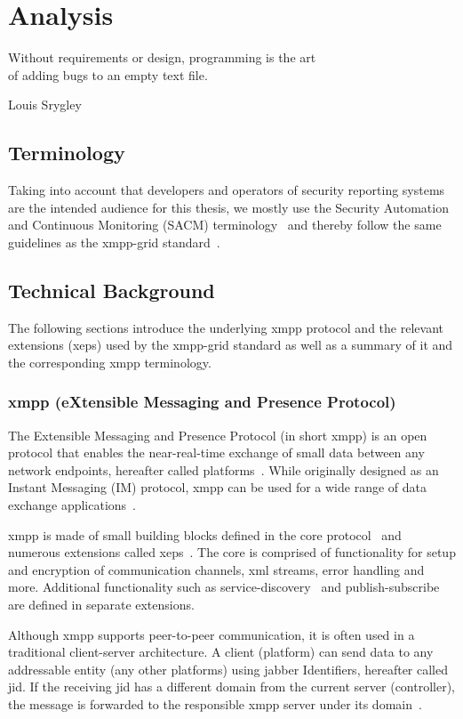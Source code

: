 \chapter{Analysis}
\epigraph{Without requirements or design, programming is the art\\of adding bugs to an empty text file.}{Louis Srygley}
\section{Terminology}
Taking into account that developers and operators of security reporting systems are the intended audience for this thesis,
we mostly use the  Security Automation and Continuous Monitoring (SACM) terminology~\cite{ietf-sacm-terminology-14}
and thereby follow the same guidelines as the \gls{xmpp-grid} standard~\cite{ietf-mile-xmpp-grid-05}.

\section{Technical Background}\label{sec:technical-background}

The following sections introduce the underlying \gls{xmpp} protocol and the relevant extensions (\glspl{xep}) used by the \gls{xmpp-grid} standard as well as a summary of it and the corresponding \gls{xmpp} terminology.

\subsection{\gls{xmpp} (eXtensible Messaging and Presence Protocol)}
The Extensible Messaging and Presence Protocol (in short \gls{xmpp}) is an open protocol that enables the near-real-time exchange of small data between any network endpoints, hereafter called \glspl{platform}~\cite{rfc6120}.
While originally designed as an Instant Messaging (IM) protocol, \gls{xmpp} can be used for a wide range of data exchange applications~\cite{ieee-xplore-stream-xml-xmpp}.

\gls{xmpp} is made of small building blocks defined in the core protocol~\cite{rfc6120} and numerous extensions called \glspl{xep}~\cite{xep-0001}.
The core is comprised of functionality for setup and encryption of communication channels, \gls{xml} streams, error handling and more. Additional functionality such as \gls{service-discovery}~\cite{xep-0030} and \gls{publish-subscribe}~\cite{xep-0060} are defined in separate extensions.

Although \gls{xmpp} supports peer-to-peer communication, it is often used in a traditional client-server architecture.
A client (\gls{platform}) can send data to any addressable entity (any other \glspl{platform}) using \Gls{jabber} Identifiers, hereafter called \gls{jid}. If the receiving \gls{jid} has a different domain from the current server (\gls{controller}), the message is forwarded to the responsible \gls{xmpp} server under its domain~\cite{rfc6120}.

